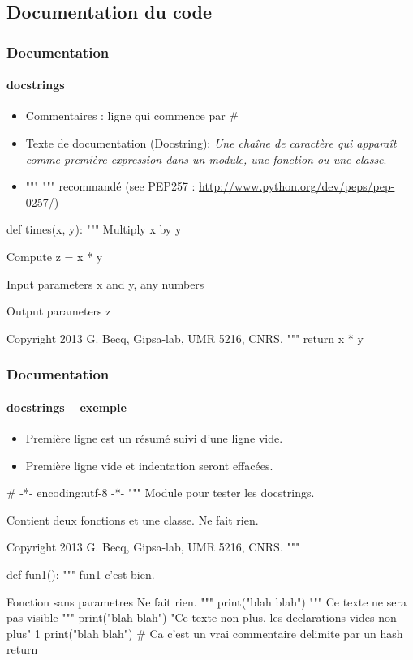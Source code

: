 \subsection{Documentation du code}
\begin{frame}[fragile]
\frametitle{Documentation}
\framesubtitle{docstrings}
\begin{itemize}
 \item Commentaires : ligne qui commence par \#
 \item Texte de documentation (Docstring): {\em Une chaîne de caractère qui apparaît comme première expression dans un module, une fonction ou une classe}. 
 \item """ """ recommandé (see PEP257 : \url{http://www.python.org/dev/peps/pep-0257/})
\end{itemize}

\begin{python}
def times(x, y): 
    """
    Multiply x by y
    
    Compute z = x * y

    Input parameters
    x and y, any numbers

    Output parameters
    z 
    
    Copyright 2013 G. Becq, Gipsa-lab, UMR 5216, CNRS.
    """
    return x * y
\end{python}
\end{frame}
\begin{frame}[fragile]
\frametitle{Documentation}
\framesubtitle{docstrings -- exemple}
\begin{itemize}
 \item Première ligne est un résumé suivi d'une ligne vide. 
 \item Première ligne vide et indentation seront effacées. 
\end{itemize}
\begin{python}
# -*- encoding:utf-8 -*-
"""
Module pour tester les docstrings.

Contient deux fonctions et une classe. 
Ne fait rien.

Copyright 2013 G. Becq, Gipsa-lab, UMR 5216, CNRS.
"""

def fun1(): 
    """
    fun1 c'est bien. 
    
    Fonction sans parametres
    Ne fait rien. 
    """
    print("blah blah")
    """
    Ce texte ne sera pas visible
    """
    print("blah blah")
    "Ce texte non plus, les declarations vides non plus"
    1
    print("blah blah")
    # Ca c'est un vrai commentaire delimite par un hash
    return
\end{python}
\end{frame}
